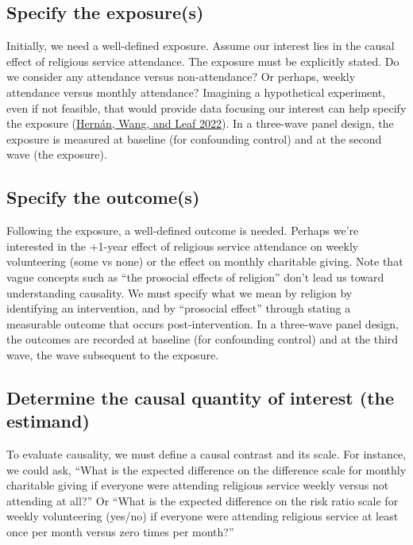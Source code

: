 \documentclass[
  singlecolumn]{report}
\begin{document}
\hypertarget{specify-the-exposures}{%
\subsection{\texorpdfstring{\textbf{Specify the
exposure(s)}}{Specify the exposure(s)}}\label{specify-the-exposures}}

Initially, we need a well-defined exposure. Assume our interest lies in
the causal effect of religious service attendance. The exposure must be
explicitly stated. Do we consider any attendance versus non-attendance?
Or perhaps, weekly attendance versus monthly attendance? Imagining a
hypothetical experiment, even if not feasible, that would provide data
focusing our interest can help specify the exposure
(\protect\hyperlink{ref-hernuxe1n2022a}{Hernán, Wang, and Leaf 2022}).
In a three-wave panel design, the exposure is measured at baseline (for
confounding control) and at the second wave (the exposure).

\hypertarget{specify-the-outcomes}{%
\subsection{\texorpdfstring{\textbf{Specify the
outcome(s)}}{Specify the outcome(s)}}\label{specify-the-outcomes}}

Following the exposure, a well-defined outcome is needed. Perhaps we're
interested in the +1-year effect of religious service attendance on
weekly volunteering (some vs none) or the effect on monthly charitable
giving. Note that vague concepts such as ``the prosocial effects of
religion'' don't lead us toward understanding causality. We must specify
what we mean by religion by identifying an intervention, and by
``prosocial effect'' through stating a measurable outcome that occurs
post-intervention. In a three-wave panel design, the outcomes are
recorded at baseline (for confounding control) and at the third wave,
the wave subsequent to the exposure.

\hypertarget{determine-the-causal-quantity-of-interest-the-estimand}{%
\subsection{\texorpdfstring{\textbf{Determine the causal quantity of
interest (the
estimand)}}{Determine the causal quantity of interest (the estimand)}}\label{determine-the-causal-quantity-of-interest-the-estimand}}

To evaluate causality, we must define a causal contrast and its scale.
For instance, we could ask, ``What is the expected difference on the
difference scale for monthly charitable giving if everyone were
attending religious service weekly versus not attending at all?'' Or
``What is the expected difference on the risk ratio scale for weekly
volunteering (yes/no) if everyone were attending religious service at
least once per month versus zero times per month?''
\end{document}
